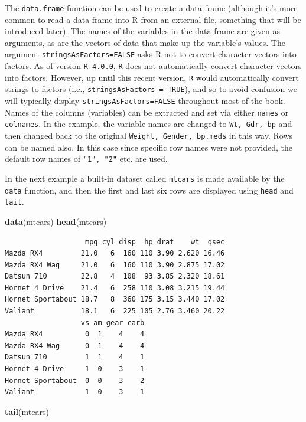 \documentclass[
]{krantz}
\makeatletter
\newenvironment{Shaded}{\begin{snugshade}}{\end{snugshade}}
\newcommand{\KeywordTok}[1]{\textcolor[rgb]{0.27,0.27,0.27}{\textbf{#1}}}
\newcommand{\NormalTok}[1]{#1}
\newenvironment{kframe}{%
\medskip{}
\setlength{\fboxsep}{.8em}
 \def\at@end@of@kframe{}%
 \ifinner\ifhmode%
  \def\at@end@of@kframe{\end{minipage}}%
  \begin{minipage}{\columnwidth}%
 \fi\fi%
 \def\FrameCommand##1{\hskip\@totalleftmargin \hskip-\fboxsep
 \colorbox{shadecolor}{##1}\hskip-\fboxsep
     \hskip-\linewidth \hskip-\@totalleftmargin \hskip\columnwidth}%
 \MakeFramed {\advance\hsize-\width
   \@totalleftmargin\z@ \linewidth\hsize
   \@setminipage}}%
 {\par\unskip\endMakeFramed%
 \at@end@of@kframe}
\renewenvironment{Shaded}{\begin{kframe}}{\end{kframe}}
\makeatother
\begin{document}
The \texttt{data.frame} function can be used to create a data frame (although it's more common to read a data frame into R from an external file, something that will be introduced later). The names of the variables in the data frame are given as arguments, as are the vectors of data that make up the variable's values. The argument \texttt{stringsAsFactors=FALSE} asks R not to convert character vectors into factors. As of version \texttt{R\ 4.0.0}, \texttt{R} does not automatically convert character vectors into factors. However, up until this recent version, \texttt{R} would automatically convert strings to factors (i.e., \texttt{stringsAsFactors\ =\ TRUE}), and so to avoid confusion we will typically display \texttt{stringsAsFactors=FALSE} throughout most of the book. Names of the columns (variables) can be extracted and set via either \texttt{names} or \texttt{colnames}. In the example, the variable names are changed to \texttt{Wt,\ Gdr,\ bp} and then changed back to the original \texttt{Weight,\ Gender,\ bp.meds} in this way. Rows can be named also. In this case since specific row names were not provided, the default row names of \texttt{"1",\ "2"} etc. are used.

In the next example a built-in dataset called \texttt{mtcars} is made available by the \texttt{data} function, and then the first and last six rows are displayed using \texttt{head} and \texttt{tail}.

\begin{Shaded}
\begin{Highlighting}[]
\KeywordTok{data}\NormalTok{(mtcars)}
\KeywordTok{head}\NormalTok{(mtcars)}
\end{Highlighting}
\end{Shaded}

\begin{verbatim}
                   mpg cyl disp  hp drat    wt  qsec
Mazda RX4         21.0   6  160 110 3.90 2.620 16.46
Mazda RX4 Wag     21.0   6  160 110 3.90 2.875 17.02
Datsun 710        22.8   4  108  93 3.85 2.320 18.61
Hornet 4 Drive    21.4   6  258 110 3.08 3.215 19.44
Hornet Sportabout 18.7   8  360 175 3.15 3.440 17.02
Valiant           18.1   6  225 105 2.76 3.460 20.22
                  vs am gear carb
Mazda RX4          0  1    4    4
Mazda RX4 Wag      0  1    4    4
Datsun 710         1  1    4    1
Hornet 4 Drive     1  0    3    1
Hornet Sportabout  0  0    3    2
Valiant            1  0    3    1
\end{verbatim}

\begin{Shaded}
\begin{Highlighting}[]
\KeywordTok{tail}\NormalTok{(mtcars)}
\end{Highlighting}
\end{Shaded}
\end{document}
